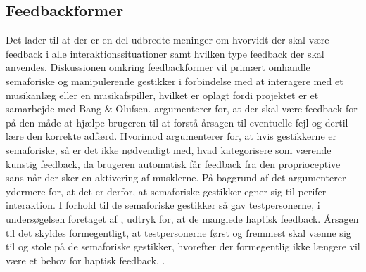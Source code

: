 \subsection{Feedbackformer}
\label{Feedbackformer}
%
Det lader til at der er en del udbredte meninger om hvorvidt der skal være feedback i alle interaktionssituationer samt hvilken type feedback der skal anvendes. Diskussionen omkring feedbackformer vil primært omhandle semaforiske og manipulerende gestikker i forbindelse med at interagere med et musikanlæg eller en musikafspiller, hvilket er oplagt fordi projektet er et samarbejde med Bang $\&$ Olufsen. \blankline
%
\textcite[s. 10]{PDF:NaturalUserInterfaces} argumenterer for, at der skal være feedback for på den måde at hjælpe brugeren til at forstå årsagen til eventuelle fejl og dertil lære den korrekte adfærd. Hvorimod \textcite[s. 16]{PDF:PIEmbeddingHCIOnTheRelevance} argumenterer for, at hvis gestikkerne er semaforiske, så er det ikke nødvendigt med, hvad \textcite[s. 16]{PDF:PIEmbeddingHCIOnTheRelevance} kategorisere som værende kunstig feedback, da brugeren automatisk får feedback fra den proprioceptive sans når der sker en aktivering af musklerne. På baggrund af det argumenterer \textcite[s. 16]{PDF:PIEmbeddingHCIOnTheRelevance} ydermere for, at det er derfor, at semaforiske gestikker egner sig til perifer interaktion. I forhold til de semaforiske gestikker så gav testpersonerne, i undersøgelsen foretaget af \textcite[ss. 172-173]{PDF:ComparingInputModalities}, udtryk for, at de manglede haptisk feedback. Årsagen til det skyldes formegentligt, at testpersonerne først og fremmest skal vænne sig til og stole på de semaforiske gestikker, hvorefter der formegentlig ikke længere vil være et behov for haptisk feedback, \parencite[s. 174]{PDF:ComparingInputModalities}. 

